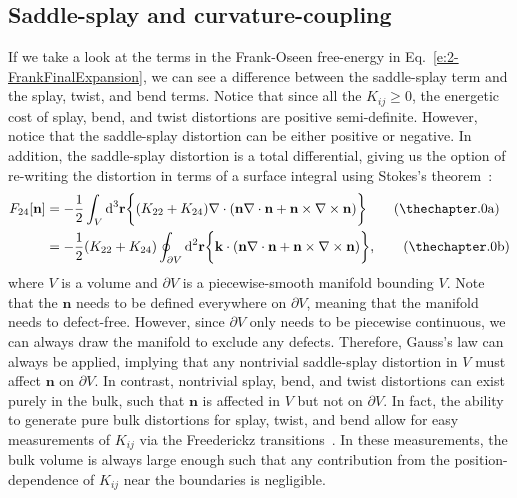 \subsection{Saddle-splay and curvature-coupling}
If we take a look at the terms in the Frank-Oseen free-energy in Eq.~\ref{e:2-FrankFinalExpansion}, we can see a difference between the saddle-splay term and the splay, twist, and bend terms.
Notice that since all the $K_{ij} \geq 0$, the energetic cost of splay, bend, and twist distortions are positive semi-definite.
However, notice that the saddle-splay distortion can be either positive or negative.
In addition, the saddle-splay distortion is a total differential, giving us the option of re-writing the distortion in terms of a surface integral using Stokes's theorem~\cite{RN230}:
\label{e:2-F24Gauss}
\begin{align}
  F_{24}[\mathbf{n}] &= - \frac{1}{2}\int_{V} \textup{d}^3  \mathbf{r} \bigg \{ (K_{22} + K_{24})  \nabla \cdot (\mathbf{n}\nabla \cdot \mathbf{n} + \mathbf{n} \times \nabla \times \mathbf{n}) \bigg \}\tag{\theequation a}  \\ &=
  - \frac{1}{2}(K_{22} + K_{24}) \oint_{\partial V} \textup{d}^2  \mathbf{r} \bigg \{   \mathbf{k} \cdot (\mathbf{n}\nabla \cdot \mathbf{n} + \mathbf{n} \times \nabla \times \mathbf{n}) \bigg \},\tag{\theequation b}
\end{align}
where $V$ is a volume and $\partial V$ is a piecewise-smooth manifold bounding $V$.
Note that the $\mathbf{n}$ needs to be defined everywhere on $\partial V$, meaning that the manifold needs to defect-free.
However, since $\partial V$ only needs to be piecewise continuous, we can always draw the manifold to exclude any defects.
Therefore, Gauss's law can always be applied, implying that any nontrivial saddle-splay distortion in $V$ must affect $\mathbf{n}$ on $\partial V$.
In contrast, nontrivial splay, bend, and twist distortions can exist purely in the bulk, such that $\mathbf{n}$ is affected in $V$ but not on $\partial V$.
In fact, the ability to generate pure bulk distortions for splay, twist, and bend allow for easy measurements of $K_{ij}$ via the Freederickz transitions~\cite{RN212,RN213,RN33,RN188,RN182,RN183}.
In these measurements, the bulk volume is always large enough such that any contribution from the position-dependence of $K_{ij}$ near the boundaries is negligible. \\

